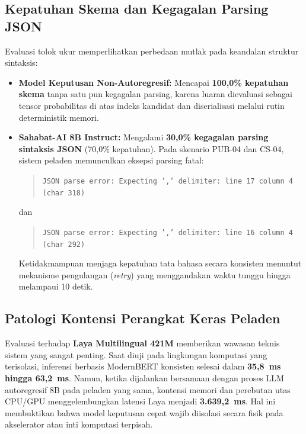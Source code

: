 \documentclass[journal,compsoc]{IEEEtran}
\begin{document}
\subsection{Kepatuhan Skema dan Kegagalan Parsing JSON}
Evaluasi tolok ukur memperlihatkan perbedaan mutlak pada keandalan struktur sintaksis:
\begin{itemize}
    \item \textbf{Model Keputusan Non-Autoregresif:} Mencapai \textbf{100,0\% kepatuhan skema} tanpa satu pun kegagalan parsing, karena luaran dievaluasi sebagai tensor probabilitas di atas indeks kandidat dan diserialisasi melalui rutin deterministik memori.
    \item \textbf{Sahabat-AI 8B Instruct:} Mengalami \textbf{30,0\% kegagalan parsing sintaksis JSON} (70,0\% kepatuhan). Pada skenario PUB-04 dan CS-04, sistem peladen memunculkan eksepsi parsing fatal:
    \begin{quote}
    \texttt{JSON parse error: Expecting ',' delimiter: line 17 column 4 (char 318)}
    \end{quote}
    dan
    \begin{quote}
    \texttt{JSON parse error: Expecting ',' delimiter: line 16 column 4 (char 292)}
    \end{quote}
    Ketidakmampuan menjaga kepatuhan tata bahasa secara konsisten menuntut mekanisme pengulangan (\textit{retry}) yang menggandakan waktu tunggu hingga melampaui 10 detik.
\end{itemize}

\subsection{Patologi Kontensi Perangkat Keras Peladen}
Evaluasi terhadap \textbf{Laya Multilingual 421M} memberikan wawasan teknis sistem yang sangat penting. Saat diuji pada lingkungan komputasi yang terisolasi, inferensi berbasis ModernBERT konsisten selesai dalam \textbf{35,8~ms hingga 63,2~ms}. Namun, ketika dijalankan bersamaan dengan proses LLM autoregresif 8B pada peladen yang sama, kontensi memori dan perebutan utas CPU/GPU menggelembungkan latensi Laya menjadi \textbf{3.639,2~ms}. Hal ini membuktikan bahwa model keputusan cepat wajib diisolasi secara fisik pada akselerator atau inti komputasi terpisah.
\end{document}
